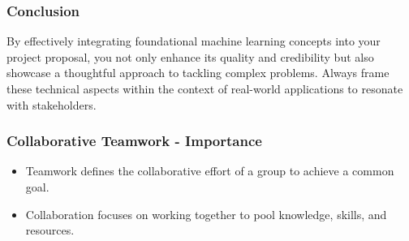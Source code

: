 \documentclass[aspectratio=169]{beamer}
\begin{document}
\begin{frame}[fragile]
    \frametitle{Conclusion}
    By effectively integrating foundational machine learning concepts into your project proposal, you not only enhance its quality and credibility but also showcase a thoughtful approach to tackling complex problems. Always frame these technical aspects within the context of real-world applications to resonate with stakeholders.
\end{frame}

\begin{frame}[fragile]
    \frametitle{Collaborative Teamwork - Importance}
    \begin{itemize}
        \item Teamwork defines the collaborative effort of a group to achieve a common goal.
        \item Collaboration focuses on working together to pool knowledge, skills, and resources.
    \end{itemize}
\end{frame}
\end{document}
